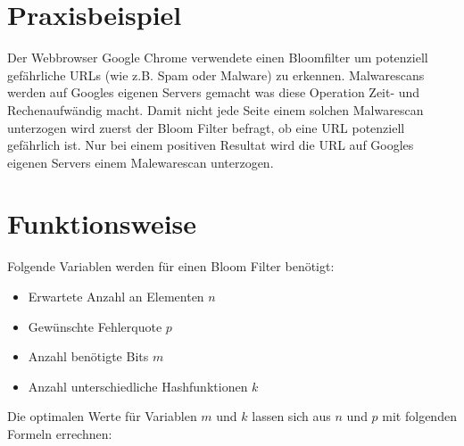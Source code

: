 \documentclass{article}
\begin{document}
    \clearpage


    \section{Praxisbeispiel}
    Der Webbrowser Google Chrome verwendete einen Bloomfilter um potenziell gefährliche URLs (wie z.B. Spam oder Malware) zu erkennen. Malwarescans werden auf Googles eigenen Servers gemacht was diese Operation Zeit- und Rechenaufwändig macht. Damit nicht jede Seite einem solchen Malwarescan unterzogen wird zuerst der Bloom Filter befragt, ob eine URL potenziell gefährlich ist. Nur bei einem positiven Resultat wird die URL auf Googles eigenen Servers einem Malewarescan unterzogen.


    \section{Funktionsweise}
    Folgende Variablen werden für einen Bloom Filter benötigt:

    \begin{itemize}
        \item Erwartete Anzahl an Elementen $n$
        \item Gewünschte Fehlerquote $p$
        \item Anzahl benötigte Bits $m$
        \item Anzahl unterschiedliche Hashfunktionen $k$
    \end{itemize}

    Die optimalen Werte für Variablen $m$ und $k$ lassen sich aus $n$ und $p$ mit folgenden Formeln errechnen:
\end{document}
